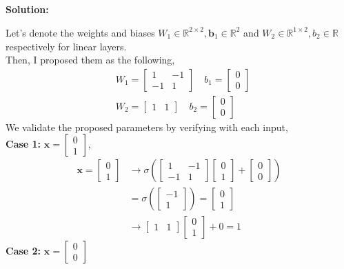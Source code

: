 \documentclass{article}
\newenvironment{solution}
  {\par\noindent\textbf{Solution:}\par}
  {\par}
\begin{document}
\subsection{}
\begin{solution}
  Let's denote the weights and biases $W_1 \in \mathbb{R}^{2\times 2},\textbf{b}_1 \in \mathbb{R}^2$ and $W_2 \in \mathbb{R}^{1 \times 2}, b_2 \in \mathbb{R}$ respectively for linear layers.
\\ 
Then, I proposed them as the following, 
\[ 
\begin{aligned}
&W_{1} = \begin{bmatrix}
1 & -1 \\
-1 & 1
\end{bmatrix} \quad b_{1} = \begin{bmatrix}
0 \\
0
\end{bmatrix} \\ 
&W_{2} = \begin{bmatrix}
1 & 1
\end{bmatrix} \quad b_{2} = \begin{bmatrix}
0 \\
0
\end{bmatrix}
\end{aligned}
\]
We validate the proposed parameters by verifying with each input,
\\ 
\textbf{Case 1:} $\mathbf{x}= \begin{bmatrix}
0 \\
1
\end{bmatrix}$,
\[ 
\begin{aligned}
\mathbf{x}= \begin{bmatrix}
0 \\
1
\end{bmatrix} &\to \sigma(\begin{bmatrix}
1 & -1  \\
-1 & 1
\end{bmatrix}\begin{bmatrix}
0 \\
1
\end{bmatrix} + \begin{bmatrix}
0 \\
0
\end{bmatrix}) \\
&= \sigma(\begin{bmatrix}
-1  \\
1
\end{bmatrix}) = \begin{bmatrix}
0 \\
1
\end{bmatrix} \\ 
&\to \begin{bmatrix}
1 & 1
\end{bmatrix}\begin{bmatrix}
0 \\
1
\end{bmatrix}+0 = 1
\end{aligned}\]
\textbf{Case 2:} $\mathbf{x}= \begin{bmatrix}
0 \\
0
\end{bmatrix}$


\end{solution}
\end{document}
